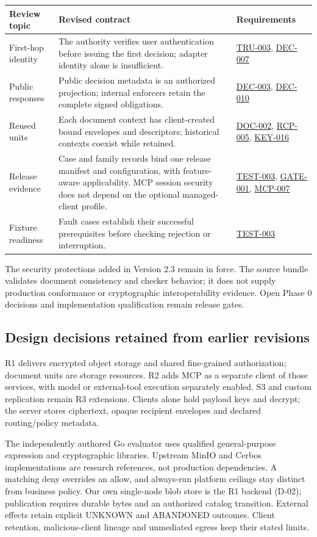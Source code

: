 \documentclass[11pt,a4paper]{article}
\newcommand{\rr}[1]{\hyperlink{req:#1}{#1}}
\begin{document}
\begin{longtable}{@{}P{0.23\textwidth}P{0.48\textwidth}P{0.19\textwidth}@{}}
\toprule Review topic & Revised contract & Requirements\\\midrule\endhead
First-hop identity & The authority verifies user authentication before issuing the first decision; adapter identity alone is insufficient. & \rr{TRU-003}, \rr{DEC-007}\\
Public responses & Public decision metadata is an authorized projection; internal enforcers retain the complete signed obligations. & \rr{DEC-003}, \rr{DEC-010}\\
Reused units & Each document context has client-created bound envelopes and descriptors; historical contexts coexist while retained. & \rr{DOC-002}, \rr{RCP-005}, \rr{KEY-016}\\
Release evidence & Case and family records bind one release manifest and configuration, with feature-aware applicability. MCP session security does not depend on the optional managed-client profile. & \rr{TEST-003}, \rr{GATE-001}, \rr{MCP-007}\\
Fixture readiness & Fault cases establish their successful prerequisites before checking rejection or interruption. & \rr{TEST-003}\\
\bottomrule
\end{longtable}

The security protections added in Version 2.3 remain in force. The source bundle validates document consistency and checker behavior; it does not supply production conformance or cryptographic interoperability evidence. Open Phase 0 decisions and implementation qualification remain release gates.

\subsection{Design decisions retained from earlier revisions}
R1 delivers encrypted object storage and shared fine-grained authorization; document units are storage resources. R2 adds MCP as a separate client of those services, with model or external-tool execution separately enabled. S3 and custom replication remain R3 extensions. Clients alone hold payload keys and decrypt; the server stores ciphertext, opaque recipient envelopes and declared routing/policy metadata.

The independently authored Go evaluator uses qualified general-purpose expression and cryptographic libraries. Upstream MinIO and Cerbos implementations are research references, not production dependencies. A matching deny overrides an allow, and always-run platform ceilings stay distinct from business policy. Our own single-node blob store is the R1 backend (D-02); publication requires durable bytes and an authorized catalog transition. External effects retain explicit UNKNOWN and ABANDONED outcomes. Client retention, malicious-client lineage and unmediated egress keep their stated limits.
\end{document}
